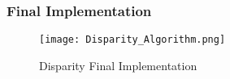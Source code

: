 \subsubsection{Final Implementation}
\begin{figure}[H]
	\centerline{\texttt{[image: Disparity\_Algorithm.png]}}
	\caption{Disparity Final Implementation}
	\label{disparityTestImp}
\end{figure}